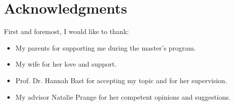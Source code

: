\chapter{Acknowledgments}

First and foremost, I would like to thank:
\begin{itemize}
    \setlength{\itemsep}{0pt} %
    \setlength{\parskip}{0pt} %
    \setlength{\parsep}{0pt} %
    \setlength{\topsep}{0pt} %

    \item My parents for supporting me during the master's program.
    \item My wife for her love and support.
    \item Prof. Dr. Hannah Bast for accepting my topic and for her supervision.
    \item My advisor Natalie Prange for her competent opinions and suggestions.
\end{itemize}